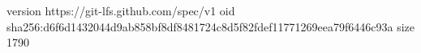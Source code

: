 version https://git-lfs.github.com/spec/v1
oid sha256:d6f6d1432044d9ab858bf8df8481724c8d5f82fdef11771269eea79f6446c93a
size 1790
